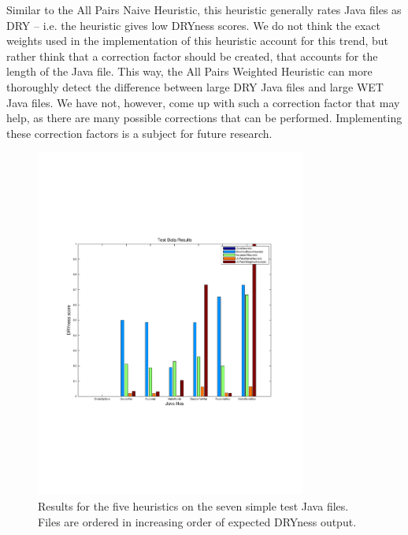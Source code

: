 \documentclass{article}
\begin{document}
Similar to the All Pairs Naive Heuristic, this heuristic generally rates Java files as DRY -- i.e. the heuristic gives low DRYness scores.
We do not think the exact weights used in the implementation of this heuristic account for this trend, but rather think that a
correction factor should be created, that accounts for the length of the Java file. This way, the All Pairs Weighted Heuristic can
more thoroughly detect the difference between large DRY Java files and large WET Java files. We have not, however, come up with 
such a correction factor that may help, as there are many possible corrections that can be performed. Implementing these correction
factors is a subject for future research.


\begin{figure}
\centering
\includegraphics[clip=true, trim=0.75in 2.5in 0in 2.5in, width=3.5in]{../testPlot.pdf}
\caption{Results for the five heuristics on the seven simple test Java files. Files are ordered in increasing order of 
expected DRYness output.}
\label{fig:test}
\end{figure}
\end{document}
